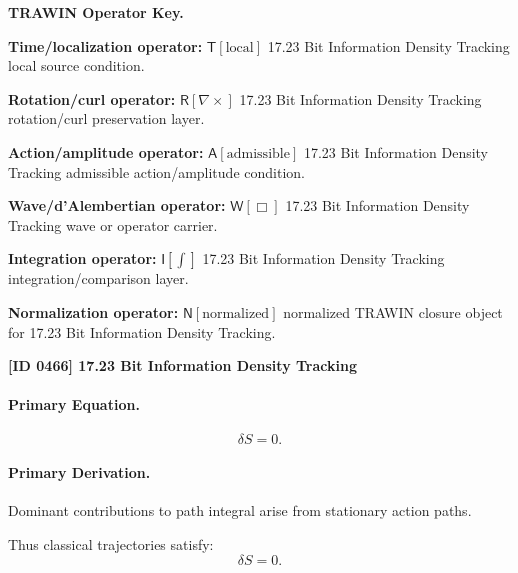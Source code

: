 \par\vspace{0.45\baselineskip}
\noindent\begin{minipage}[t]{\linewidth}
\begingroup
\small
\raggedright
\textbf{TRAWIN Operator Key.}\par
\noindent\textbf{Time/localization operator:} $\mathsf{T}\!\left[\mathrm{local}\right]$ 17.23 Bit Information Density Tracking local source condition.\par
\noindent\textbf{Rotation/curl operator:} $\mathsf{R}\!\left[\nabla\times\right]$ 17.23 Bit Information Density Tracking rotation/curl preservation layer.\par
\noindent\textbf{Action/amplitude operator:} $\mathsf{A}\!\left[\mathrm{admissible}\right]$ 17.23 Bit Information Density Tracking admissible action/amplitude condition.\par
\noindent\textbf{Wave/d'Alembertian operator:} $\mathsf{W}\!\left[\Box\right]$ 17.23 Bit Information Density Tracking wave or operator carrier.\par
\noindent\textbf{Integration operator:} $\mathsf{I}\!\left[\int\right]$ 17.23 Bit Information Density Tracking integration/comparison layer.\par
\noindent\textbf{Normalization operator:} $\mathsf{N}\!\left[\mathrm{normalized}\right]$ normalized TRAWIN closure object for 17.23 Bit Information Density Tracking.\par
\endgroup
\end{minipage}

\clearpage
\noindent\textbf{[ID 0466] 17.23 Bit Information Density Tracking}\par
\vspace{0.35em}
\paragraph{Primary Equation.}
\begin{equation}
\delta S = 0.
\end{equation}

\paragraph{Primary Derivation.}
Dominant contributions to path integral arise from stationary action paths.

Thus classical trajectories satisfy:
\begin{equation}
\boxed{\delta S = 0.}
\end{equation}

